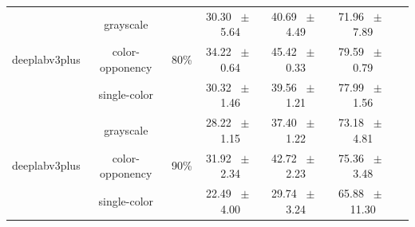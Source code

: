 \begin{table}[h]
\begin{tabular}{@{}lccc ccc@{}}
    \midrule
    \multirow{3}{*}{deeplabv3plus} & grayscale & \multirow{3}{*}{80\%} & 30.30 ~$\pm$~ 5.64 & 40.69 ~$\pm$~ 4.49 & 71.96 ~$\pm$~ 7.89 \\
    & color-opponency & & 34.22 ~$\pm$~ 0.64 & 45.42 ~$\pm$~ 0.33 & 79.59 ~$\pm$~ 0.79 \\
    & single-color & & 30.32 ~$\pm$~ 1.46 & 39.56 ~$\pm$~ 1.21 & 77.99 ~$\pm$~ 1.56 \\
    \midrule
    \multirow{3}{*}{deeplabv3plus} & grayscale & \multirow{3}{*}{90\%} & 28.22 ~$\pm$~ 1.15 & 37.40 ~$\pm$~ 1.22 & 73.18 ~$\pm$~ 4.81 \\
    & color-opponency & & 31.92 ~$\pm$~ 2.34 & 42.72 ~$\pm$~ 2.23 & 75.36 ~$\pm$~ 3.48 \\
    & single-color & & 22.49 ~$\pm$~ 4.00 & 29.74 ~$\pm$~ 3.24 & 65.88 ~$\pm$~ 11.30 \\
    \midrule
    \bottomrule
  \end{tabular}
  \label{tab:sparse_deeplabv3plus_acdc_snow}
\end{table}